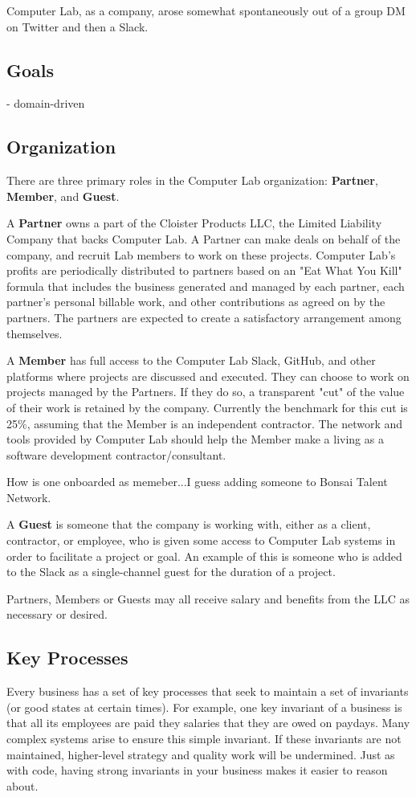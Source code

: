 \documentclass[12pt]{article}
\begin{document}
Computer Lab, as a company, arose somewhat spontaneously out of a group DM on
Twitter and then a Slack.

\subsection{Goals}

- domain-driven


\subsection{Organization}

There are three primary roles in the Computer Lab organization: \textbf{Partner},
\textbf{Member}, and \textbf{Guest}.

A \textbf{Partner} owns a part of the Cloister Products LLC, the Limited Liability
Company that backs Computer Lab.  A Partner can make deals on behalf of the
company, and recruit Lab members to work on these projects.  Computer Lab's
profits are periodically distributed to partners based on an "Eat What You Kill"
formula that includes the business generated and managed by each partner, each
partner's personal billable work, and other contributions as agreed on by the
partners.  The partners are expected to create a satisfactory arrangement among
themselves.

A \textbf{Member} has full access to the Computer Lab Slack, GitHub, and other
platforms where projects are discussed and executed.  They can choose to work on
projects managed by the Partners.  If they do so, a transparent "cut" of the
value of their work is retained by the company.  Currently the benchmark for
this cut is 25\%, assuming that the Member is an independent contractor.  The
network and tools provided by Computer Lab should help the Member make a living
as a software development contractor/consultant.

How is one onboarded as memeber...I guess adding someone to Bonsai Talent
Network.

A \textbf{Guest} is someone that the company is working with, either as a client,
contractor, or employee, who is given some access to Computer Lab systems in
order to facilitate a project or goal.  An example of this is someone who is
added to the Slack as a single-channel guest for the duration of a project.

Partners, Members or Guests may all receive salary and benefits from
the LLC as necessary or desired.

\subsection{Key Processes}
Every business has a set of key processes that seek to maintain a set of
invariants (or good states at certain times). For example, one key invariant of
a business is that all its employees are paid they salaries that they are owed
on paydays. Many complex systems arise to ensure this simple invariant.
If these invariants are not maintained, higher-level strategy and quality work
will be undermined. Just as with code, having strong invariants in your business
makes it easier to reason about.
\end{document}
